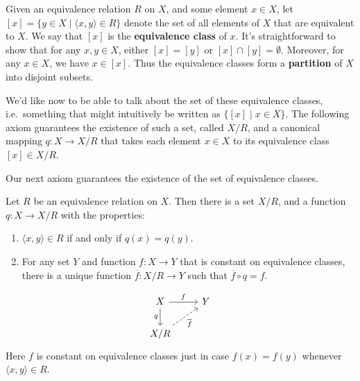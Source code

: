 Given an equivalence relation $R$ on $X$, and some element $x\in X$,
let $[x]=\{ y\in X \mid \langle x,y\rangle \in R \}$ denote the set of
all elements of $X$ that are equivalent to $X$.  We say that $[x]$ is
the {\bf equivalence class} of $x$.  It's straightforward to show that
for any $x,y\in X$, either $[x]=[y]$ or $[x]\cap [y]=\emptyset$.
Moreover, for any $x\in X$, we have $x\in [x]$.  Thus the equivalence
classes form a {\bf partition} of $X$ into disjoint subsets.

We'd like now to be able to talk about the set of these equivalence
classes, i.e.\ something that might intuitively be written as $\{
[x]\mid x\in X \}$.  The following axiom guarantees the existence of
such a set, called $X/R$, and a canonical mapping $q:X\to X/R$ that
takes each element $x\in X$ to its equivalence class $[x]\in X/R$.



Our next axiom guarantees the existence of the set of equivalence
classes.

\begin{axi}{}
Let $R$ be an equivalence relation on $X$.  Then there is a
set $X/R$, and a function $q:X\to X/R$ with the properties: 
\begin{enumerate}
\item $\langle x,y\rangle \in R$ if and only if $q(x)=q(y)$.
\item For any set $Y$ and function $f:X\to Y$ that is constant on
  equivalence classes, there is a unique function $\overline{f}:X/R\to
  Y$ such that $\overline{f}\circ q=f$.  \end{enumerate}
\[ \begin{tikzcd} X \arrow[r,"f"] \arrow[d,"q"'] & Y \\
  X/R \arrow[dashed,ur,"\overline{f}"'] \end{tikzcd} \] Here $f$ is
constant on equivalence classes just in case $f(x)=f(y)$ whenever
$\langle x,y\rangle \in R$.  \label{ax:eq}
\end{axi}


